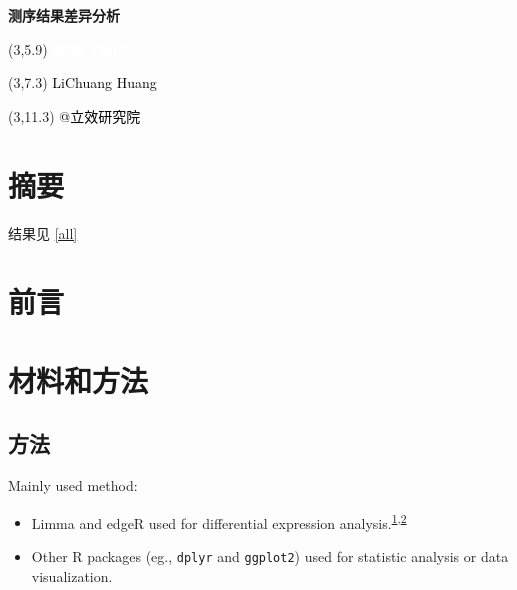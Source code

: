 \documentclass[
]{article}
\author{}
\date{\vspace{-2.5em}}
\providecommand{\tightlist}{%
  \setlength{\itemsep}{0pt}\setlength{\parskip}{0pt}}
\begin{document}
\begin{titlepage} 
\begin{center} \textbf{\Huge 测序结果差异分析}
\vspace{4em} \begin{textblock}{10}(3,5.9) \huge
\textbf{\textcolor{white}{2023-12-13}}
\end{textblock} \begin{textblock}{10}(3,7.3)
\Large \textcolor{black}{LiChuang Huang}
\end{textblock} \begin{textblock}{10}(3,11.3)
\Large \textcolor{black}{@立效研究院}
\end{textblock} \end{center} \end{titlepage}
\restoregeometry


\tableofcontents

\listoffigures

\listoftables

\newpage


\hypertarget{abstract}{%
\section{摘要}\label{abstract}}

结果见 \ref{all}

\hypertarget{introduction}{%
\section{前言}\label{introduction}}

\hypertarget{methods}{%
\section{材料和方法}\label{methods}}

\hypertarget{ux65b9ux6cd5}{%
\subsection{方法}\label{ux65b9ux6cd5}}

Mainly used method:

\begin{itemize}
\tightlist
\item
  Limma and edgeR used for differential expression analysis.\textsuperscript{\protect\hyperlink{ref-LimmaPowersDiRitchi2015}{1},\protect\hyperlink{ref-EdgerDifferenChen}{2}}
\item
  Other R packages (eg., \texttt{dplyr} and \texttt{ggplot2}) used for statistic analysis or data visualization.
\end{itemize}
\end{document}
